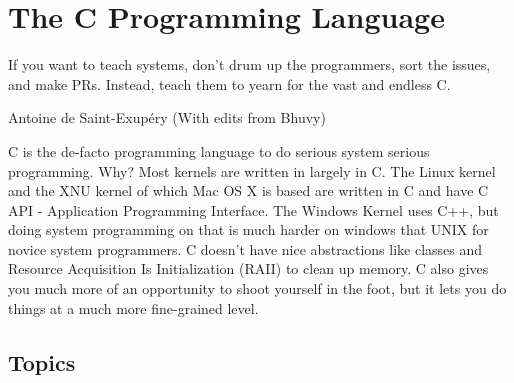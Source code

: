 \chapter{The C Programming Language}

\epigraph{If you want to teach systems, don't drum up the programmers, sort the issues, and make PRs. Instead, teach them to yearn for the vast and endless C.}{Antoine de Saint-Exup\'{e}ry (With edits from Bhuvy)}

\gls{C} is the de-facto programming language to do serious system serious programming.
Why? Most kernels are written in largely in C.
The \gls{Linux kernel} \cite{Love} and the XNU kernel \citet{xnukernel} of which Mac OS X is based are written in C and have C API - Application Programming Interface.
The Windows Kernel uses C++, but doing system programming on that is much harder on windows that UNIX for novice system programmers.
C doesn't have nice abstractions like classes and Resource Acquisition Is Initialization (RAII) to clean up memory.
C also gives you much more of an opportunity to shoot yourself in the foot, but it lets you do things at a much more fine-grained level.











\section{Topics}

